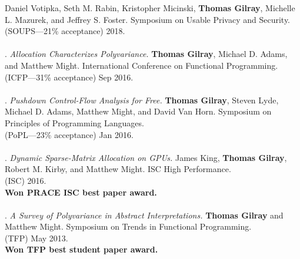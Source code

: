 Daniel Votipka, Seth M. Rabin, Kristopher Micinski, \textbf{Thomas Gilray}, Michelle L. Mazurek, and Jeffrey S. Foster.
Symposium on Usable Privacy and Security.
\\(SOUPS---21\% acceptance) 2018. 
\\ \vspace{-0.1cm}\\
\paper. \textit{Allocation Characterizes Polyvariance.}
\textbf{Thomas Gilray}, Michael D. Adams, and Matthew Might.
International Conference on Functional Programming.
\\(ICFP---31\% acceptance) Sep 2016. 
\\ \vspace{-0.1cm}\\
\paper. \textit{Pushdown Control-Flow Analysis for Free.}
\textbf{Thomas Gilray}, Steven Lyde, Michael D. Adams, Matthew Might, and David Van Horn.
Symposium on Principles of Programming Languages.
\\(PoPL---23\% acceptance) Jan 2016. 
\\ \vspace{-0.1cm}\\
\paper. \textit{Dynamic Sparse-Matrix Allocation on GPUs.}
James King, \textbf{Thomas Gilray}, Robert M. Kirby, and Matthew Might.
ISC High Performance.
\\(ISC) 2016. 
\\\textbf{Won PRACE ISC best paper award.} \\ \vspace{-0.1cm}\\
\paper. \textit{A Survey of Polyvariance in Abstract Interpretations.}
\textbf{Thomas Gilray} and Matthew Might.
Symposium on Trends in Functional Programming.
\\(TFP) May 2013. 
\\\textbf{Won TFP best student paper award.} \\ \vspace{-0.1cm}\\
